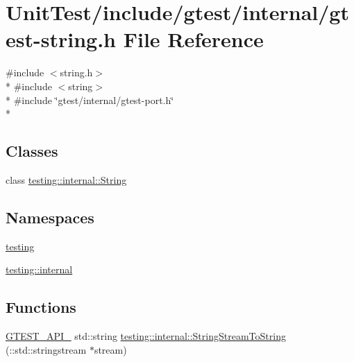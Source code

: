 \hypertarget{gtest-string_8h}{\section{Unit\+Test/include/gtest/internal/gtest-\/string.h File Reference}
\label{gtest-string_8h}
}
{\ttfamily \#include $<$string.\+h$>$}\\*
{\ttfamily \#include $<$string$>$}\\*
{\ttfamily \#include \char`\"{}gtest/internal/gtest-\/port.\+h\char`\"{}}\\*
\subsection*{Classes}
\begin{DoxyCompactItemize}
\item 
class \hyperlink{classtesting_1_1internal_1_1_string}{testing\+::internal\+::\+String}
\end{DoxyCompactItemize}
\subsection*{Namespaces}
\begin{DoxyCompactItemize}
\item 
 \hyperlink{namespacetesting}{testing}
\item 
 \hyperlink{namespacetesting_1_1internal}{testing\+::internal}
\end{DoxyCompactItemize}
\subsection*{Functions}
\begin{DoxyCompactItemize}
\item 
\hyperlink{gtest-port_8h_aa73be6f0ba4a7456180a94904ce17790}{G\+T\+E\+S\+T\+\_\+\+A\+P\+I\+\_\+} std\+::string \hyperlink{namespacetesting_1_1internal_a75bdbc38815772055696b2a40bae614e}{testing\+::internal\+::\+String\+Stream\+To\+String} (\+::std\+::stringstream $\ast$stream)
\end{DoxyCompactItemize}
